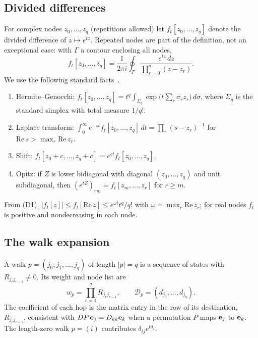 \documentclass[aps,pra,superscriptaddress,floatfix,longbibliography,twocolumn]{revtex4-2}
\newcommand{\be}{{\bf e}}
\begin{document}
\subsection{Divided differences}
For complex nodes $z_0,\dots,z_q$ (repetitions allowed) let $f_t[z_0,\dots,z_q]$ denote the divided difference of $z\mapsto e^{tz}$. Repeated nodes are part of the definition, not an exceptional case: with $\Gamma$ a contour enclosing all nodes,
\begin{equation}\label{eq:dd_contour}
f_t[z_0,\dots,z_q]=\frac{1}{2\pi i}\oint_\Gamma \frac{e^{tz}\,dz}{\prod_{r=0}^q (z-z_r)} .
\end{equation}
We use the following standard facts~\cite{deboor2005,higham2008,opitz1964}.
\begin{enumerate}
\item[(D1)] Hermite--Genocchi: $f_t[z_0,\dots,z_q]=t^q\int_{\Sigma_q}\exp\!\big(t\sum_r\sigma_r z_r\big)\,d\sigma$, where $\Sigma_q$ is the standard simplex with total measure $1/q!$.
\item[(D2)] Laplace transform: $\int_0^\infty e^{-st}f_t[z_0,\dots,z_q]\,dt=\prod_r (s-z_r)^{-1}$ for $\mathrm{Re}\,s>\max_r\mathrm{Re}\,z_r$.
\item[(D3)] Shift: $f_t[z_0+c,\dots,z_q+c]=e^{ct}f_t[z_0,\dots,z_q]$.
\item[(D4)] Opitz: if $Z$ is lower bidiagonal with diagonal $(z_0,\dots,z_q)$ and unit subdiagonal, then $(e^{tZ})_{rm}=f_t[z_m,\dots,z_r]$ for $r\ge m$.
\end{enumerate}
From (D1), $|f_t[z]|\le f_t[\mathrm{Re}\,z]\le e^{\omega t}t^q/q!$ with $\omega=\max_r\mathrm{Re}\,z_r$; for real nodes $f_t$ is positive and nondecreasing in each node.

\subsection{The walk expansion}
A walk $p=(j_0,j_1,\dots,j_q)$ of length $|p|=q$ is a sequence of states with $R_{j_rj_{r-1}}\neq0$. Its weight and node list are
\begin{equation}
w_p=\prod_{r=1}^q R_{j_r j_{r-1}},\qquad \mathcal{D}_p=(d_{j_0},\dots,d_{j_q}).
\end{equation}
The coefficient of each hop is the matrix entry in the row of its destination, $R_{j_rj_{r-1}}$, consistent with $DP\,\be_j=D_{kk}\be_k$ when a permutation $P$ maps $\be_j$ to $\be_k$. The length-zero walk $p=(i)$ contributes $\delta_{ij}e^{td_i}$.
\end{document}
